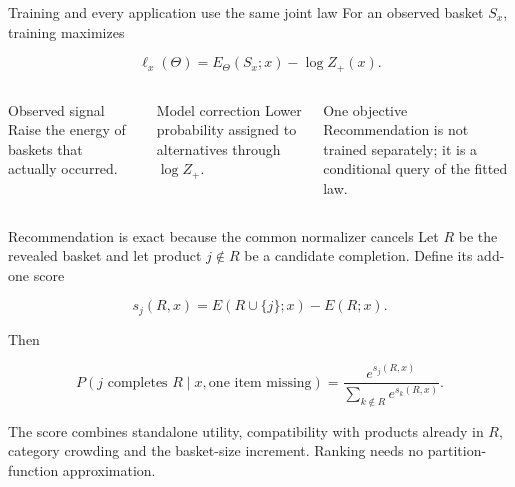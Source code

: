 \documentclass[aspectratio=169,11pt,t]{beamer}
\begin{document}
\begin{frame}{Training and every application use the same joint law}
For an observed basket $S_x$, training maximizes

\[
\ell_x(\Theta)=E_{\Theta}(S_x;x)-\log Z_{+}(x).
\]

\begin{columns}[T,onlytextwidth]
  \begin{block}{Observed signal}
  Raise the energy of baskets that actually occurred.
  \end{block}

  \begin{block}{Model correction}
  Lower probability assigned to alternatives through $\log Z_{+}$.
  \end{block}

  \begin{block}{One objective}
  Recommendation is not trained separately; it is a conditional query of the fitted law.
  \end{block}
\end{columns}

\end{frame}

\begin{frame}{Recommendation is exact because the common normalizer cancels}
\small
Let $R$ be the revealed basket and let product $j\notin R$ be a candidate completion.
Define its add-one score

\[
s_j(R,x)=E(R\cup\{j\};x)-E(R;x).
\]

Then

\[
\boxed{
P(j\text{ completes }R\mid x,\text{one item missing})
=\frac{e^{s_j(R,x)}}{\sum_{k\notin R}e^{s_k(R,x)}}.
}
\]

The score combines standalone utility, compatibility with products already in $R$,
category crowding and the basket-size increment. Ranking needs no partition-function
approximation.
\end{frame}
\end{document}
